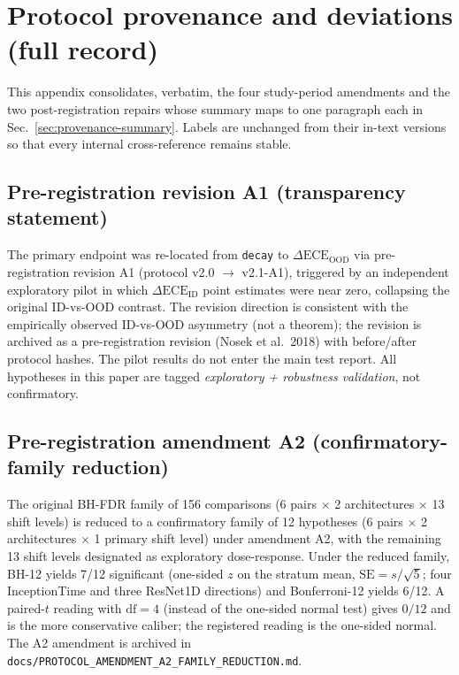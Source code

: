 \documentclass[review,12pt,nonatbib]{elsarticle}
\begin{document}
\appendix

\section{Protocol provenance and deviations (full record)}
\label{app:provenance}

This appendix consolidates, verbatim, the four study-period
amendments and the two post-registration repairs whose summary maps
to one paragraph each in Sec.~\ref{sec:provenance-summary}. Labels
are unchanged from their in-text versions so that every internal
cross-reference remains stable.

\subsection{Pre-registration revision A1 (transparency statement)}
The primary endpoint was re-located from \texttt{decay} to
$\Delta\text{ECE}_{\text{OOD}}$ via pre-registration revision A1
(protocol v2.0 $\rightarrow$ v2.1-A1), triggered by an independent
exploratory pilot in which $\Delta\text{ECE}_{\text{ID}}$ point
estimates were near zero, collapsing the original ID-vs-OOD contrast.
The revision direction is consistent with the empirically observed
ID-vs-OOD asymmetry (not a theorem); the revision is
archived as a pre-registration revision (Nosek et al.\ 2018) with
before/after protocol hashes. The pilot results do not enter the
main test report. All hypotheses in this paper are tagged
\emph{exploratory + robustness validation}, not confirmatory.

\subsection{Pre-registration amendment A2 (confirmatory-family reduction)}
\label{sec:a2}
The original
BH-FDR family of 156 comparisons (6 pairs $\times$ 2 architectures
$\times$ 13 shift levels) is reduced to a confirmatory family of 12
hypotheses (6 pairs $\times$ 2 architectures $\times$ 1 primary shift
level) under amendment A2, with the remaining 13 shift levels
designated as exploratory dose-response. Under the reduced family,
BH-12 yields 7/12 significant (one-sided $z$ on the stratum mean,
$\mathrm{SE}=s/\sqrt{5}$; four InceptionTime and three ResNet1D
directions) and Bonferroni-12 yields 6/12. A paired-$t$ reading with
$\mathrm{df}{=}4$ (instead of the one-sided normal test) gives $0/12$
and is the more conservative caliber; the registered reading is the
one-sided normal. The A2 amendment is archived in
\texttt{docs/PROTOCOL\_AMENDMENT\_A2\_}\allowbreak\texttt{FAMILY\_REDUCTION.md}.
\end{document}
